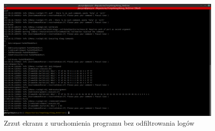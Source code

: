 	\begin{figure}[p]
	\includegraphics[scale=0.3]{ExecutionOnSeverityInfo.png}
	\caption{Zrzut ekranu z uruchomienia programu bez odfiltrowania logów}
	\end{figure}


